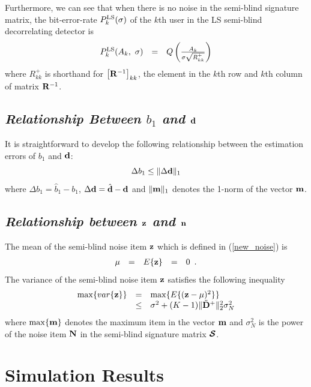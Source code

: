 \documentclass[10pt,fleqn,twocolumn]{IEEEtran}
\newcommand{\bd}{{\bf d}}
\newcommand{\bm}{{\bf m}}
\newcommand{\bn}{{\bf n}}
\newcommand{\bz}{{\bf z}}
\newcommand{\bN}{{\bf N}}
\newcommand{\bD}{{\bf D}}
\newcommand{\bR}{{\bf R}}
\newcommand{\bcS}{{\mbox {\boldmath ${\cal S}$}}}
\begin{document}
Furthermore, we can see that when there is no noise in the semi-blind
signature matrix, the bit-error-rate $P^{\rm LS}_{k}(\sigma)$ of the
$k$th user in the LS semi-blind decorrelating detector is
\begin{equation}
\begin{array}{rcl}
P^{\rm LS}_{k}(A_k,\
\sigma)&=&Q\left({A_k\over\sigma\sqrt{R_{kk}^+}}\right)
\end{array}
\end{equation}
where $R_{kk}^+$ is shorthand for $\left[\bR^{-1}\right]_{kk}$,
the element in the $k$th row and $k$th column of matrix $\bR^{-1}$.

\subsection{\em Relationship Between $b_1$ and $\bd$}

It is straightforward to develop the following relationship between
the estimation errors of $b_1$ and $\bd$:
\begin{equation}
\Delta b_1 \leq \|\Delta\bd\|_1
\label{b_error}
\end{equation}
where $\Delta b_1=\hat{b}_1-b_1$, $\Delta\bd=\hat{\bd}-\bd$ and
$\|\bm\|_1$ denotes the 1-norm of the vector $\bm$.

\subsection{\em Relationship between $\bz$ and $\bn$}
The mean of the semi-blind noise item $\bz$ which is
defined in (\ref{new_noise}) is
\begin{equation}
\begin{array}{rcccl}
\mu&=&E\{\bz\}&=&0 \enspace .
\end{array}
\end{equation}
The variance of the semi-blind noise item $\bz$ satisfies
the following inequality
\begin{equation}
\begin{array}{rcl}
\max\{var\{\bz\}\}&=&\max\{E\{(\bz-\mu)^2\}\}\\
&\leq&\sigma^2+(K-1)\|\tilde{\bD}^+\|_2^2\sigma_N^2
\end{array} \label{noise_mean}
\end{equation}
where $\max\{\bm\}$ denotes the maximum item in the vector $\bm$ and
$\sigma_N^2$ is the power of the noise item $\bN$ in the semi-blind
signature matrix $\bcS$.

\section{Simulation Results}
\end{document}

